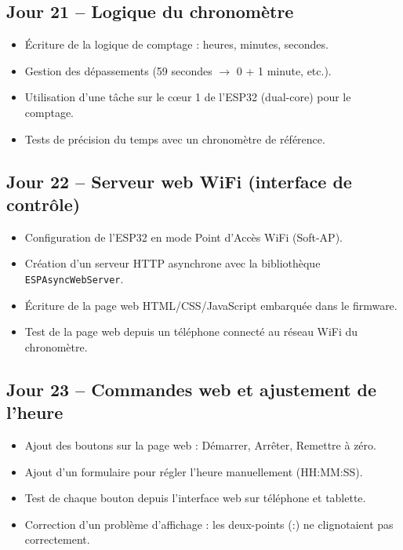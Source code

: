 \documentclass[12pt,a4paper]{article}
\begin{document}
\subsection*{Jour 21 -- Logique du chronomètre}
\begin{itemize}
    \item Écriture de la logique de comptage : heures, minutes, secondes.
    \item Gestion des dépassements (59 secondes $\rightarrow$ 0 + 1 minute, etc.).
    \item Utilisation d'une tâche sur le cœur 1 de l'ESP32 (dual-core) pour le comptage.
    \item Tests de précision du temps avec un chronomètre de référence.
\end{itemize}

\subsection*{Jour 22 -- Serveur web WiFi (interface de contrôle)}
\begin{itemize}
    \item Configuration de l'ESP32 en mode Point d'Accès WiFi (Soft-AP).
    \item Création d'un serveur HTTP asynchrone avec la bibliothèque \texttt{ESPAsyncWebServer}.
    \item Écriture de la page web HTML/CSS/JavaScript embarquée dans le firmware.
    \item Test de la page web depuis un téléphone connecté au réseau WiFi du chronomètre.
\end{itemize}

\subsection*{Jour 23 -- Commandes web et ajustement de l'heure}
\begin{itemize}
    \item Ajout des boutons sur la page web : Démarrer, Arrêter, Remettre à zéro.
    \item Ajout d'un formulaire pour régler l'heure manuellement (HH:MM:SS).
    \item Test de chaque bouton depuis l'interface web sur téléphone et tablette.
    \item Correction d'un problème d'affichage : les deux-points (:) ne clignotaient pas correctement.
\end{itemize}
\end{document}

